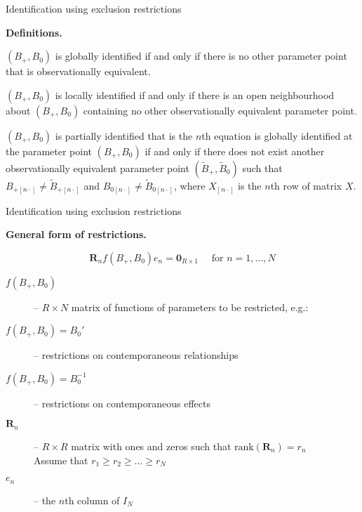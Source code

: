 \documentclass[notes,blackandwhite,mathsans,usenames,dvipsnames]{beamer}
\begin{document}
\begin{frame}{Identification using exclusion restrictions}

\textbf{Definitions.}

 $(B_+,B_0)$ {\color{mcxs2}is {\color{purple}globally identified} if and only if there is no other parameter point that is observationally equivalent.}

 $(B_+,B_0)$ {\color{mcxs2}is {\color{purple}locally identified} if and only if there is an
open neighbourhood about} $(B_+,B_0)$ {\color{mcxs2}containing no other observationally equivalent parameter point.}

 $(B_+,B_0)$ {\color{mcxs2}is} {\color{purple}partially identified} {\color{mcxs2}that is the {\color{purple}$n$th equation is globally identified }at the parameter point} $(B_+,B_0)$ {\color{mcxs2}if and only if there does not exist another observationally equivalent parameter point} $(\tilde{B}_+,\tilde{B}_0)$ {\color{mcxs2}such that} $B_{+[n\cdot]}\neq \tilde{B}_{+[n\cdot]}$ {\color{mcxs2}and} $B_{0[n\cdot]}\neq \tilde{B}_{0[n\cdot]}${\color{mcxs2}, where $X_{[n\cdot]}$ is the $n$th row of matrix $X$.}

\end{frame}


\begin{frame}{Identification using exclusion restrictions}

\textbf{General form of restrictions.}

$$ \mathbf{R}_n f\left(B_+,B_0\right) e_n = \mathbf{0}_{R\times 1} \quad\text{ for } n=1,\dots,N $$

\bigskip\begin{description}
\item[$f\left(B_+,B_0\right)$] {\color{mcxs2}--} $R\times N$ {\color{mcxs2}matrix of functions of parameters to be restricted, e.g.:}
\item[$f\left(B_+,B_0\right)=B_0'$] {\color{mcxs2}-- restrictions on contemporaneous relationships}
\item[$f\left(B_+,B_0\right)=B_0^{-1}$] {\color{mcxs2}-- restrictions on contemporaneous effects}

\bigskip\item[$\mathbf{R}_n$] {\color{mcxs2}--} $R\times R$ {\color{mcxs2}matrix with ones and zeros such that} $\text{rank}\left(\mathbf{R}_n\right)=r_n$\\
{\color{mcxs2}Assume that} $r_1\geq r_2\geq \dots\geq r_N$

\bigskip\item[$e_n$] {\color{mcxs2}-- the} $n${\color{mcxs2}th column of} $I_N$
\end{description}

\end{frame}
\end{document}
